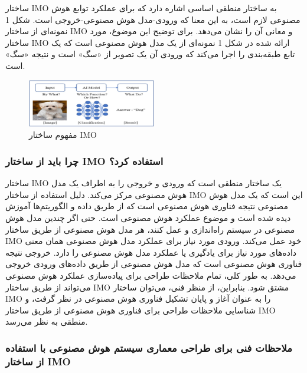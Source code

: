 \documentclass[a4paper,10pt]{article}
\begin{document}
                ساختار IMO به ساختار منطقی اساسی اشاره دارد که برای عملکرد توابع هوش مصنوعی لازم است، به این معنا که ورودی-مدل هوش مصنوعی-خروجی است. شکل 1 نمونه‌ای از ساختار IMO و معانی آن را نشان می‌دهد. برای توضیح این موضوع، مورد ساختار IMO ارائه شده در شکل 1 نمونه‌ای از یک مدل هوش مصنوعی است که یک تابع طبقه‌بندی را اجرا می‌کند که ورودی آن یک تصویر از «سگ» است و نتیجه «سگ» است.

                \begin{figure}[htbp]

                    \centering
                    \includegraphics[width=0.5\textwidth]{image/fig 1.png}
                    \caption{مفهوم ساختار IMO}
                    \label{fig:fig_1}
            
                \end{figure}

            \subsubsection{چرا باید از ساختار IMO استفاده کرد؟}

                ساختار IMO یک ساختار منطقی است که ورودی و خروجی را به اطراف یک مدل هوش مصنوعی مرکز می‌کند. دلیل استفاده از ساختار IMO این است که یک مدل هوش مصنوعی نتیجه فناوری هوش مصنوعی است که از طریق داده و الگوریتم‌ها آموزش دیده شده است و موضوع عملکرد هوش مصنوعی است. حتی اگر چندین مدل هوش مصنوعی در سیستم راه‌اندازی و عمل کنند، هر مدل هوش مصنوعی از طریق ساختار IMO خود عمل می‌کند. ورودی مورد نیاز برای عملکرد مدل هوش مصنوعی همان معنی داده‌های مورد نیاز برای یادگیری یا عملکرد مدل هوش مصنوعی را دارد. خروجی نتیجه فناوری هوش مصنوعی است که مدل هوش مصنوعی از طریق داده‌های ورودی خروجی می‌دهد. به طور کلی، تمام ملاحظات طراحی برای پیاده‌سازی عملکرد هوش مصنوعی می‌تواند از طریق ساختار IMO مشتق شود. بنابراین، از منظر فنی، می‌توان ساختار IMO را به عنوان آغاز و پایان تشکیل فناوری هوش مصنوعی در نظر گرفت، و شناسایی ملاحظات طراحی برای فناوری هوش مصنوعی از طریق ساختار IMO منطقی به نظر می‌رسد.
    
            \subsubsection{ملاحظات فنی برای طراحی معماری سیستم هوش مصنوعی با استفاده از ساختار IMO}
\end{document}
